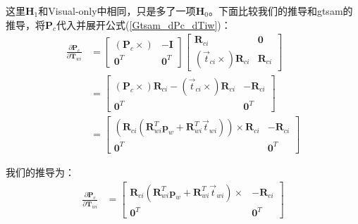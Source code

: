\documentclass{article}
\begin{document}
这里$\boldsymbol{H}_1$和Visual-only中相同，只是多了一项$\boldsymbol{H}_0$。下面比较我们的推导和gtsam的推导，将$\boldsymbol{P}_c$代入并展开公式(\ref{Gtsam_dPc_dTiw})：
\begin{equation}
	\begin{aligned}
		\frac{\partial{\boldsymbol{P}_c}}{\partial{\boldsymbol{T}_{wi}}}                                    & =                   
		\left[          
		\begin{matrix}
		(\boldsymbol{P}_c\times)                                                                           & -\boldsymbol{I}      \\
		\boldsymbol{0}^T                                                                                    & \boldsymbol{0}^T    
		\end{matrix}
		\right]
		\left[                        
		\begin{matrix}
		\boldsymbol{R}_{ci}                                                                                 & \boldsymbol{0}      \\
		(\vec{t}_{ci}\times) \boldsymbol{R}_{ci}                                                            & \boldsymbol{R}_{ci} 
		\end{matrix}
		\right]\\&=
		\left[                        
		\begin{matrix}
		(\boldsymbol{P}_c\times)\boldsymbol{R}_{ci}-(\vec{t}_{ci}\times) \boldsymbol{R}_{ci}               & -\boldsymbol{R}_{ci} \\
		\boldsymbol{0}^T                                                                                    & \boldsymbol{0}^T    
		\end{matrix}
		\right]\\&=
		\left[
		\begin{matrix}
		(\boldsymbol{R}_{ci}(\boldsymbol{R}_{wi}^T\boldsymbol{p}_w + \boldsymbol{R}_{wi}^T\vec{t}_{wi}))\times \boldsymbol{R}_{ci} & -\boldsymbol{R}_{ci} \\
		\boldsymbol{0}^T                                                                                    & \boldsymbol{0}^T    
		\end{matrix}
		\right]
		\label{Gtsam_dPc_dTiw_2}
	\end{aligned}
\end{equation}

我们的推导为：
\begin{equation}
	\begin{aligned}
		\frac{\partial{\boldsymbol{P}_c}}{\partial{\boldsymbol{T}_{wi}}}                                      & =                   
		\left[
		\begin{matrix}
		\boldsymbol{R}_{ci}(\boldsymbol{R}_{wi}^T  \boldsymbol{p}_w+\boldsymbol{R}_{wi}^T\vec{t}_{wi})\times & -\boldsymbol{R}_{ci} \\ 
		\boldsymbol{0}^T                                                                                      & \boldsymbol{0}^T    
		\end{matrix}
		\right] 
		\label{Gtsam_dPc_dTiw_Jin}
	\end{aligned}
\end{equation}
\end{document}
